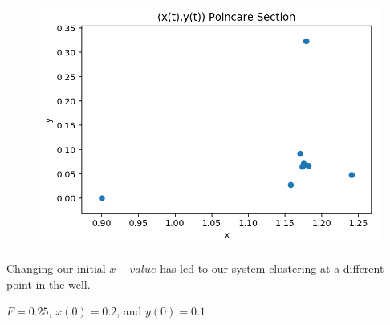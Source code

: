 \documentclass{article}
\begin{document}
\begin{figure}[h!]
\includegraphics[scale=0.4]{poincare2.png}
\end{figure}

Changing our initial $x-value$ has led to our system clustering at a different point in the well.

$F = 0.25$, $x(0) = 0.2$, and $y(0) = 0.1$
\end{document}
